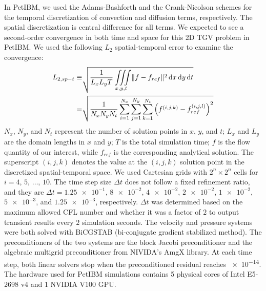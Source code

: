 In PetIBM, we used the Adams-Bashforth and the Crank-Nicolson schemes for the temporal discretization of convection and diffusion terms, respectively.
The spatial discretization is central difference for all terms.
We expected to see a second-order convergence in both time and space for this 2D TGV problem in PetIBM.
We used the following $L_2$ spatial-temporal error to examine the convergence:
\begin{equation}\label{eq:spt-err-def}
    \begin{aligned}
    L_{2,sp-t} \equiv &\sqrt{
        \frac{1}{L_x L_y T}
        \iiint\limits_{x, y, t} \lVert f - f_{ref} \rVert^2 \mathop{}\!\mathrm{d} x \mathop{}\!\mathrm{d} y \mathop{}\!\mathrm{d} t
    } \\
    = &
    \sqrt{\frac{1}{N_x N_y N_t}\sum\limits_{i=1}^{N_x}\sum\limits_{j=1}^{N_y}\sum\limits_{k=1}^{N_t}\left(f^{(i, j, k)} - f_{ref}^{(i, j, l)}\right)^2}
    \end{aligned}
\end{equation}
$N_x$, $N_y$, and $N_t$ represent the number of solution points in $x$, $y$, and $t$;
$L_x$ and $L_y$ are the domain lengths in $x$ and $y$;
$T$ is the total simulation time;
$f$ is the flow quantity of our interest, while $f_{ref}$ is the corresponding analytical solution.
The superscript $(i, j, k)$ denotes the value at the $(i, j, k)$ solution point in the discretized spatial-temporal space.
We used Cartesian grids with $2^{n} \times 2^{n}$ cells for $i=4$, $5$, $\dots$, $10$.
The time step size $\Delta t$ does not follow a fixed refinement ratio, and they are $\Delta t = \num{1.25e-1}$, $\num{8e-2}$, $\num{4e-2}$, $\num{2e-2}$, $\num{1e-2}$, $\num{5e-3}$, and $\num{1.25e-3}$, respectively.
$\Delta t$ was determined based on the maximum allowed CFL number and whether it was a factor of $2$ to output transient results every $\num{2}$ simulation seconds.
The velocity and pressure systems were both solved with BiCGSTAB (bi-conjugate gradient stabilized method).
The preconditioners of the two systems are the block Jacobi preconditioner and the algebraic multigrid preconditioner from NIVIDA's AmgX library.
At each time step, both linear solvers stop when the preconditioned residual reaches \num{e-14}.
The hardware used for PetIBM simulations contains 5 physical cores of Intel E5-2698 v4 and 1 NVIDIA V100 GPU.

